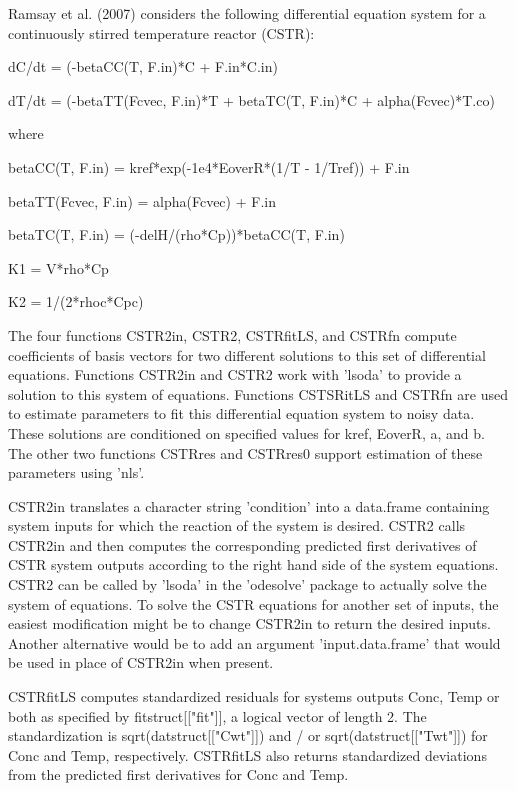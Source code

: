 \documentclass{article}
\begin{document}
\begin{Details}\relax
Ramsay et al. (2007) considers the following differential equation 
system for a continuously stirred temperature reactor (CSTR):

dC/dt = (-betaCC(T, F.in)*C + F.in*C.in)

dT/dt = (-betaTT(Fcvec, F.in)*T + betaTC(T, F.in)*C +
alpha(Fcvec)*T.co)

where

betaCC(T, F.in) = kref*exp(-1e4*EoverR*(1/T - 1/Tref)) + F.in

betaTT(Fcvec, F.in) = alpha(Fcvec) + F.in

betaTC(T, F.in) = (-delH/(rho*Cp))*betaCC(T, F.in)


K1 = V*rho*Cp

K2 = 1/(2*rhoc*Cpc)  

The four functions CSTR2in, CSTR2, CSTRfitLS, and CSTRfn compute
coefficients of basis vectors for two different solutions to this set
of differential equations.  Functions CSTR2in and CSTR2 work with
'lsoda' to provide a solution to this system of equations.  Functions 
CSTSRitLS and CSTRfn are used to estimate parameters to fit this
differential equation system to noisy data.  These solutions are
conditioned on specified values for kref, EoverR, a, and b.  The other
two functions CSTRres and CSTRres0 support estimation of these
parameters using 'nls'.    

CSTR2in translates a character string 'condition' into a data.frame
containing system inputs for which the reaction of the system is
desired.  CSTR2 calls CSTR2in and then computes the corresponding
predicted first derivatives of CSTR system outputs according to the
right hand side of the system equations.  CSTR2 can be called by
'lsoda' in the 'odesolve' package to actually solve the system of
equations.  To solve the CSTR equations for another set of inputs, the
easiest modification might be to change CSTR2in to return the desired
inputs.  Another alternative would be to add an argument
'input.data.frame' that would be used in place of CSTR2in when
present.

CSTRfitLS computes standardized residuals for systems outputs Conc, 
Temp or both as specified by fitstruct[["fit"]], a logical vector of 
length 2.  The standardization is sqrt(datstruct[["Cwt"]]) and / or
sqrt(datstruct[["Twt"]]) for Conc and Temp, respectively.  CSTRfitLS
also returns standardized deviations from the predicted first
derivatives for Conc and Temp.


\end{Details}
\end{document}
